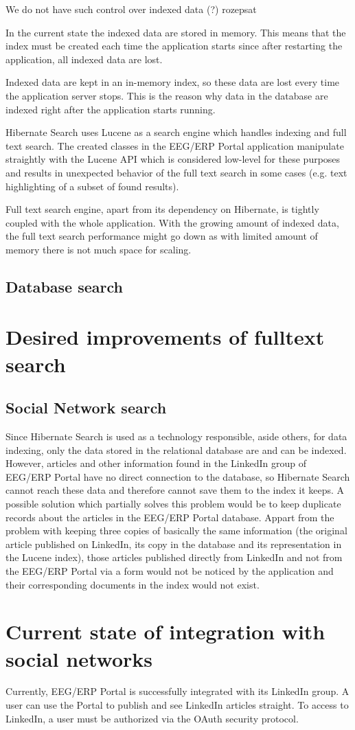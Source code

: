 We do not have such control over indexed data (?) rozepsat

In the current state the indexed data are stored in memory. This means
that the index must be created each time the application starts since
after restarting the application, all indexed data are lost.

Indexed data are kept in an in-memory index, so these data are lost every time the application server stops. This is the reason why data in the database are indexed right after the application starts running.

Hibernate Search uses Lucene as a search engine which handles indexing
and full text search. The created classes in the EEG/ERP Portal application
manipulate straightly with the Lucene API which is considered low-level
for these purposes and results in unexpected behavior of the full
text search in some cases (e.g. text highlighting of a subset of found
results).

Full text search engine, apart from its dependency on Hibernate, is
tightly coupled with the whole application. With the growing amount
of indexed data, the full text search performance might go down as
with limited amount of memory there is not much space for scaling.


\subsection{Database search}


\section{Desired improvements of fulltext search}


\subsection{Social Network search}

Since Hibernate Search is used as a technology responsible, aside others, for data indexing, only the data stored in the relational database are and can be indexed. However, articles and other information found in the LinkedIn group of EEG/ERP Portal have no direct connection to the database, so Hibernate Search cannot reach these data and therefore cannot save them to the index it keeps. A possible solution which partially solves this problem would be to keep duplicate records about the articles in the EEG/ERP Portal database. Appart from the problem with keeping three copies of basically the same information (the original article published on LinkedIn, its copy in the database and its representation in the Lucene index), those articles published directly from LinkedIn and not from the EEG/ERP Portal via a form would not be noticed by the application and their corresponding documents in the index would not exist.


\section{Current state of integration with social networks}

Currently, EEG/ERP Portal is successfully integrated with its LinkedIn group. A user can use the Portal to publish and see LinkedIn articles straight. To access to LinkedIn, a user must be authorized via the OAuth security protocol.